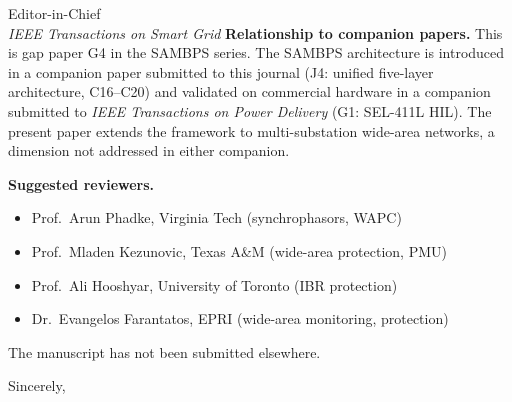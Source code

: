 \documentclass[11pt,a4paper]{letter}
\begin{document}
\begin{letter}{Editor-in-Chief\\
               \textit{IEEE Transactions on Smart Grid}}
\medskip
\noindent\textbf{Relationship to companion papers.}
This is gap paper G4 in the SAMBPS series.  The SAMBPS architecture is introduced
in a companion paper submitted to this journal (J4: unified five-layer architecture,
C16--C20) and validated on commercial hardware in a companion submitted to
\textit{IEEE Transactions on Power Delivery} (G1: SEL-411L HIL).  The present
paper extends the framework to multi-substation wide-area networks, a dimension
not addressed in either companion.

\medskip
\noindent\textbf{Suggested reviewers.}
\begin{itemize}
  \item Prof.\ Arun Phadke, Virginia Tech (synchrophasors, WAPC)
  \item Prof.\ Mladen Kezunovic, Texas A\&M (wide-area protection, PMU)
  \item Prof.\ Ali Hooshyar, University of Toronto (IBR protection)
  \item Dr.\ Evangelos Farantatos, EPRI (wide-area monitoring, protection)
\end{itemize}

\medskip
\noindent
The manuscript has not been submitted elsewhere.

\closing{Sincerely,}
\end{letter}
\end{document}
